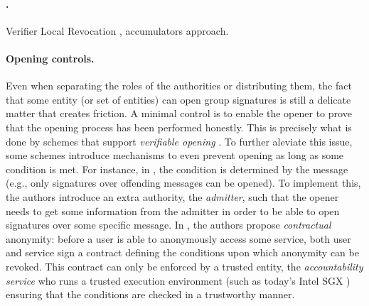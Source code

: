 \paragraph{.}
Verifier Local Revocation \cite{bs04}, accumulators approach.

\paragraph{Opening controls.}
Even when separating the roles of the authorities or distributing them, the
fact that some entity (or set of entities) can open group signatures is still
a delicate matter that creates friction. A minimal control is to enable the
opener to prove that the opening process has been performed honestly. This is
precisely what is done by schemes that support \emph{verifiable opening}
\needcite. To further aleviate this issue, some schemes
introduce mechanisms to even prevent opening as long as some condition is
met. For instance, in \cite{seh+12,ehk+19}, the condition is determined by
the message (e.g., only signatures over offending messages can be opened).
To implement this, the authors introduce an extra authority, the
\emph{admitter}, such that the opener needs to get some information from the
admitter in order to be able to open signatures over some specific message.
In \cite{sbm10}, the authors propose \emph{contractual} anonymity: before a user
is able to anonymously access some service, both user and service sign a
contract defining the conditions upon which anonymity can be revoked. This
contract can only be enforced by a trusted entity, the \emph{accountability
  service} who runs a trusted execution environment (such as today's Intel
SGX \needcite) ensuring that the conditions are checked in a trustworthy manner.

